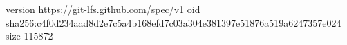 version https://git-lfs.github.com/spec/v1
oid sha256:c4f0d234aad8d2e7c5a4b168efd7c03a304e381397e51876a519a6247357e024
size 115872
